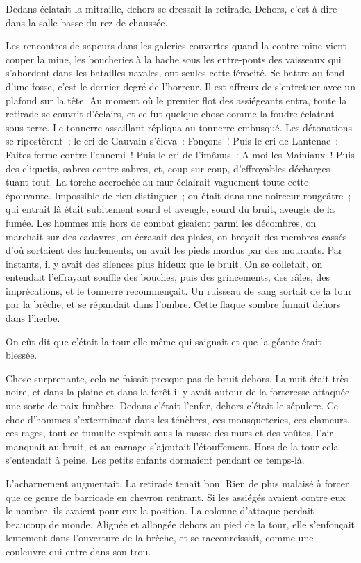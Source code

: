 \documentclass[french,twoside]{book} %
\begin{document}
Dedans éclatait la mitraille, dehors se dressait la retirade. Dehors, c’est-à-dire dans la salle basse du rez-de-chaussée.\par
Les rencontres de sapeurs dans les galeries couvertes quand la contre-mine vient couper la mine, les boucheries à la hache sous les entre-ponts des vaisseaux qui s’abordent dans les batailles navales, ont seules cette férocité. Se battre au fond d’une fosse, c’est le dernier degré de l’horreur. Il est affreux de s’entretuer  avec un plafond sur la tête. Au moment où le premier flot des assiégeants entra, toute la retirade se couvrit d’éclairs, et ce fut quelque chose comme la foudre éclatant sous terre. Le tonnerre assaillant répliqua au tonnerre embusqué. Les détonations se ripostèrent ; le cri de Gauvain s’éleva : Fonçons ! Puis le cri de Lantenac : Faites ferme contre l’ennemi ! Puis le cri de l’imânus : A moi les Mainiaux ! Puis des cliquetis, sabres contre sabres, et, coup sur coup, d’effroyables décharges tuant tout. La torche accrochée au mur éclairait vaguement toute cette épouvante. Impossible de rien distinguer ; on était dans une noirceur rougeâtre ; qui entrait là était subitement sourd et aveugle, sourd du bruit, aveugle de la fumée. Les hommes mis hors de combat gisaient parmi les décombres, on marchait sur des cadavres, on écrasait des plaies, on broyait des membres cassés d’où sortaient des hurlements, on avait les pieds mordus par des mourants. Par instants, il y avait des silences plus hideux que le bruit. On se colletait, on entendait l’effrayant souffle des bouches, puis des grincements, des râles, des imprécations, et le tonnerre recommençait. Un ruisseau de sang sortait de la tour par la brèche, et se répandait dans l’ombre. Cette flaque sombre fumait dehors dans l’herbe.\par
On eût dit que c’était la tour elle-même qui saignait et que la géante était blessée.\par
Chose surprenante, cela ne faisait presque pas de bruit dehors. La nuit était très noire, et dans la plaine et dans la forêt il y avait autour de la forteresse attaquée  une sorte de paix funèbre. Dedans c’était l’enfer, dehors c’était le sépulcre. Ce choc d’hommes s’exterminant dans les ténèbres, ces mousqueteries, ces clameurs, ces rages, tout ce tumulte expirait sous la masse des murs et des voûtes, l’air manquait au bruit, et au carnage s’ajoutait l’étouffement. Hors de la tour cela s’entendait à peine. Les petits enfants dormaient pendant ce temps-là.\par
L’acharnement augmentait. La retirade tenait bon. Rien de plus malaisé à forcer que ce genre de barricade en chevron rentrant. Si les assiégés avaient contre eux le nombre, ils avaient pour eux la position. La colonne d’attaque perdait beaucoup de monde. Alignée et allongée dehors au pied de la tour, elle s’enfonçait lentement dans l’ouverture de la brèche, et se raccourcissait, comme une couleuvre qui entre dans son trou.\par
\end{document}
